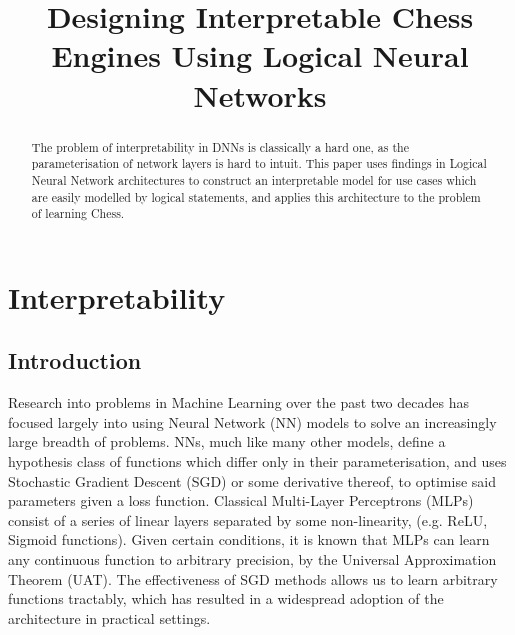 \documentclass[conference]{report}
\begin{document}
\def\T{\textbf{T}}
\def\F{\textbf{F}}
\def\NOT{\texttt{NOT}}
\def\AND{\texttt{AND}}
\def\OR{\texttt{OR}}
\def\XOR{\texttt{XOR}}
\def\R{\mathbb{R}}
\def\B{\mathbb{B}}

\title{\LARGE Designing Interpretable Chess Engines Using Logical Neural Networks}

\maketitle
\thispagestyle{plain}
\pagestyle{plain}

\begin{abstract}
The problem of interpretability in DNNs is classically a hard one, as the parameterisation of network layers is hard to intuit. This paper uses findings in Logical Neural Network architectures to construct an interpretable model for use cases which are easily modelled by logical statements, and applies this architecture to the problem of learning Chess.  
\end{abstract}

\tableofcontents

\pagebreak

\chapter{Interpretability}

\section{Introduction}

Research into problems in Machine Learning over the past two decades has focused largely into using Neural Network (NN) models to solve an increasingly large breadth of problems. NNs, much like many other models, define a hypothesis class of functions which differ only in their parameterisation, and uses Stochastic Gradient Descent (SGD) or some derivative thereof, to optimise said parameters given a loss function. Classical Multi-Layer Perceptrons (MLPs) consist of a series of linear layers separated by some non-linearity, (e.g. ReLU, Sigmoid functions). Given certain conditions, it is known that MLPs can learn any continuous function to arbitrary precision, by the Universal Approximation Theorem (UAT). The effectiveness of SGD methods allows us to learn arbitrary functions tractably, which has resulted in a widespread adoption of the architecture in practical settings.
\end{document}
